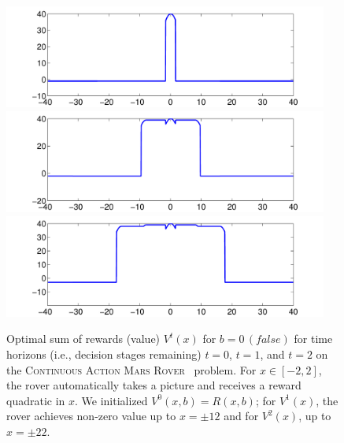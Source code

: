 \documentclass[twoside,11pt]{article}
\newcommand{\MarsRover}{\textsc{Mars Rover }}
\newcommand{\false}{\mathit{false}}
\begin{document}
\begin{figure}[t!]
\begin{minipage}[b]{0.48\linewidth}
\includegraphics[width=0.95\textwidth]{Figures2/diagrams/v1_2d.pdf}\\
\includegraphics[width=0.95\textwidth]{Figures2/diagrams/v2_2d.pdf}\\
\includegraphics[width=0.95\textwidth]{Figures2/diagrams/v3_2d.pdf}

\caption{\footnotesize Optimal sum of rewards (value) 
$V^t(x)$ for $b = 0 \, 
(\false)$ for time horizons (i.e., decision stages remaining) $t=0$,
$t=1$, and $t=2$ on the \textsc{Continuous Action}  \MarsRover\ problem.  For $x \in [-2,2]$, the
rover automatically takes a picture and receives a reward quadratic in
$x$.  We initialized $V^0(x,b) = R(x,b)$; for $V^1(x)$, the rover achieves
non-zero value up to $x = \pm 12$ and for 
$V^2(x)$, up to $x = \pm 22$.}
\label{fig:opt_graph}


\end{minipage}
\end{figure}
\end{document}
